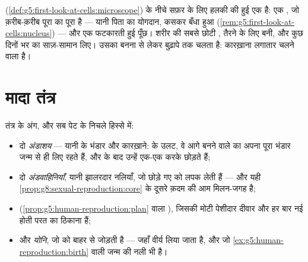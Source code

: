 \begin{example}[शुक्राणु, पास से]\label{ex:g8:reproductive-systems:sperm}
 (\cref{def:g5:first-look-at-cells:microscope}) के नीचे
 सफ़र के लिए हलकी की हुई एक  है: एक , जो क़रीब-क़रीब
पूरा का पूरा  है --- यानी पिता का योगदान, कसकर बँधा हुआ
(\cref{rem:g5:first-look-at-cells:nucleus}) --- और एक फटकारती हुई
पूँछ। शरीर की सबसे छोटी , तैरने के लिए बनी, और कुछ दिनों भर का
साज़-सामान लिए। उसका बनना  से लेकर बुढ़ापे तक चलता है: 
कारख़ाना लगातार चलने वाला है।
\end{example}

\section{मादा तंत्र}

\begin{definition}[मादा जनन-तंत्र]\label{def:g8:reproductive-systems:female}
 तंत्र के अंग, और सब पेट के निचले हिस्से में:
\begin{itemize}
  \item दो \emph{अंडाशय} --- यानी  के भंडार और
        कारख़ाने:  के उलट, वे आगे बनने वाले \emph{} का
        अपना पूरा भंडार जन्म से ही लिए रहते हैं, और  के बाद
        उन्हें एक-एक करके छोड़ते हैं;
  \item दो \emph{अंडवाहिनियाँ}, यानी झालरदार नलियाँ,
        जो छोड़े गए  को लपक लेती हैं --- और यही
        \cref{prop:g8:sexual-reproduction:core} के दूसरे क़दम की आम
        मिलन-जगह है;
  \item \emph{} (\cref{prop:g5:human-reproduction:plan} वाला
        ), जिसकी मोटी पेशीदार दीवार और हर बार नई होती परत
         का ठिकाना हैं;
  \item और \emph{योनि}, जो  को बाहर से जोड़ती है --- जहाँ वीर्य
        लिया जाता है, और जो \cref{ex:g5:human-reproduction:birth} वाली
        जन्म की नली भी है।
\end{itemize}
\end{definition}

